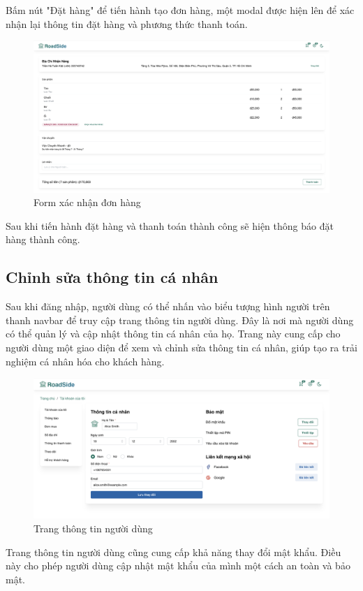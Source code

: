 Bấm nút "Đặt hàng" để tiến hành tạo đơn hàng, một modal được hiện lên để xác nhận lại thông tin đặt hàng và phương thức thanh toán.

    \begin{figure}[H]
        \begin{center}
        \includegraphics[scale=0.3] {Images/UI/orderform.png}
        \end{center}
        \caption{Form xác nhận đơn hàng}
    \end{figure}
Sau khi tiến hành đặt hàng và thanh toán thành công sẽ hiện thông báo đặt hàng thành công.
\subsection{Chỉnh sửa thông tin cá nhân}
Sau khi đăng nhập, người dùng có thể nhấn vào biểu tượng hình người trên thanh navbar để truy cập trang thông tin người dùng. Đây là nơi mà người dùng có thể quản lý và cập nhật thông tin cá nhân của họ. Trang này cung cấp cho người dùng một giao diện để xem và chỉnh sửa thông tin cá nhân, giúp tạo ra trải nghiệm cá nhân hóa cho khách hàng.

    \begin{figure}[H]
        \begin{center}
        \includegraphics[scale=0.3] {Images/UI/info profile.png}
        \end{center}
        \caption{Trang thông tin người dùng}
    \end{figure}
Trang thông tin người dùng cũng cung cấp khả năng thay đổi mật khẩu. Điều này cho phép người dùng cập nhật mật khẩu của mình một cách an toàn và bảo mật.

